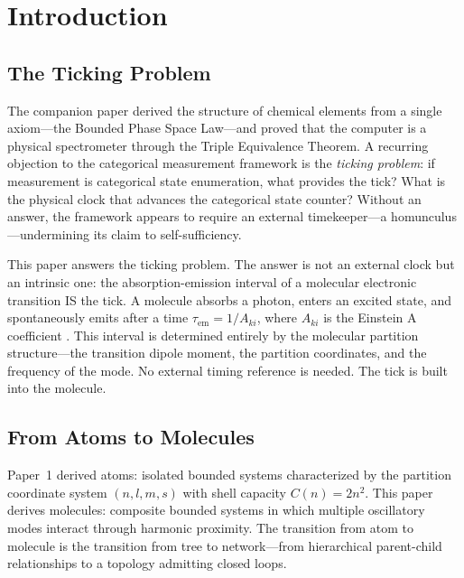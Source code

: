 \documentclass[11pt,a4paper]{article}
\theoremstyle{definition}
\theoremstyle{remark}
\newcommand{\tem}{\tau_{\mathrm{em}}}
\newcommand{\Aki}{A_{ki}}
\begin{document}
\section{Introduction}
\label{sec:introduction}

\subsection{The Ticking Problem}

The companion paper \citep{sachikonye2025a} derived the structure of chemical elements from a single axiom---the Bounded Phase Space Law---and proved that the computer is a physical spectrometer through the Triple Equivalence Theorem. A recurring objection to the categorical measurement framework is the \emph{ticking problem}: if measurement is categorical state enumeration, what provides the tick? What is the physical clock that advances the categorical state counter? Without an answer, the framework appears to require an external timekeeper---a homunculus---undermining its claim to self-sufficiency.

This paper answers the ticking problem. The answer is not an external clock but an intrinsic one: the absorption-emission interval of a molecular electronic transition IS the tick. A molecule absorbs a photon, enters an excited state, and spontaneously emits after a time $\tem = 1/\Aki$, where $\Aki$ is the Einstein A coefficient \citep{einstein1917}. This interval is determined entirely by the molecular partition structure---the transition dipole moment, the partition coordinates, and the frequency of the mode. No external timing reference is needed. The tick is built into the molecule.

\subsection{From Atoms to Molecules}

Paper~1 \citep{sachikonye2025a} derived atoms: isolated bounded systems characterized by the partition coordinate system $(n, l, m, s)$ with shell capacity $C(n) = 2n^2$. This paper derives molecules: composite bounded systems in which multiple oscillatory modes interact through harmonic proximity. The transition from atom to molecule is the transition from tree to network---from hierarchical parent-child relationships to a topology admitting closed loops.
\end{document}
